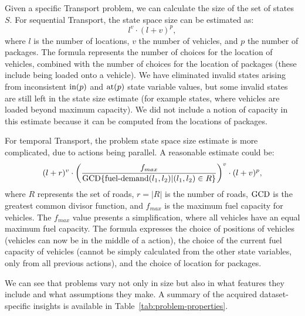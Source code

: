 Given a specific Transport problem, we can calculate the size of the set of states $S$.
For sequential Transport, the state space size can be estimated as: $$l^v \cdot (l+v)^p,$$ where $l$ is the number of locations,
$v$ the number of vehicles, and $p$ the number of packages. The formula represents
the number of choices for the location of vehicles, combined with the number of choices
for the location of packages (these include being loaded onto a vehicle). We have eliminated
invalid states arising from inconsistent $\textrm{in}(p)$ and $\textrm{at}(p)$ state variable values,
but some invalid states are still left in the state size estimate (for example states,
where vehicles are loaded beyond maximum capacity). We did not include a notion of
capacity in this estimate because it can be computed from the locations of packages.

For temporal Transport, the problem state space size estimate is more complicated,
due to actions being parallel. A reasonable estimate could be:
$$(l+r)^v \cdot \left(\frac{f_{max}}{\textrm{GCD} \{\textrm{fuel-demand}(l_1, l_2) | (l_1, l_2) \in R\}}\right)^v \cdot (l+v)^p,$$ where $R$ represents the set of roads, $r = |R|$ is the number of roads,
$\textrm{GCD}$ is the greatest common divisor function,
and $f_{max}$ is the maximum fuel capacity for vehicles. The $f_{max}$ value presents a simplification, where all vehicles
have an equal maximum fuel capacity.
The formula expresses the choice of positions of vehicles (vehicles can now be in the middle
of a \drive{} action), the choice of the current fuel capacity of vehicles (cannot be simply
calculated from the other state variables, only from all previous actions),
and the choice of location for packages.

We can see that problems vary not only in size but also in what features they include
and what assumptions they make.
A summary of the acquired dataset-specific insights is available in Table~\ref{tab:problem-properties}.

